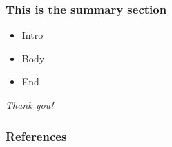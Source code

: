 \documentclass[aspectratio=169]{beamer}
\begin{document}
\begin{frame}
	\frametitle{This is the summary section}
	\begin{itemize}
	    \item Intro
	    \item Body 
	    \item End
	\end{itemize}
	
	\vspace{10mm}
	\Large
	\hfill\textit{Thank you!}
\end{frame}

\begin{frame}
	\frametitle{References}
	
	\nocite{*}
	
\end{frame}
\end{document}
